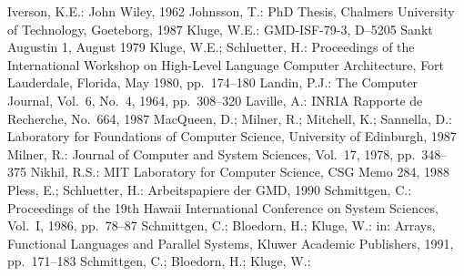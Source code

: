 {\begin{thebibliography}{AAAA}
%
Iverson, K.E.:
\bmt
{}
\amt
John Wiley, 1962
%
%
Johnsson, T.:
\bmt
{}
\amt
PhD Thesis, Chalmers
University of Technology, Goeteborg, 1987
%
Kluge, W.E.:
\bmt
{}
\amt
GMD-ISF-79-3, D--5205 Sankt Augustin 1, August 1979
%
Kluge, W.E.; Schluetter, H.:
\bmt
{}
\amt
Proceedings of the International Workshop on
High-Level Language Computer Architecture,
Fort Lauderdale, Florida, May 1980,
pp.~174--180
%
Landin, P.J.:
\bmt
{}
\amt
The Computer Journal, Vol.~6, No.~4, 1964,
pp.~308--320
%
Laville, A.:
\bmt
{}
\amt
INRIA Rapporte de Recherche, No.~664, 1987
%
MacQueen, D.; Milner, R.; Mitchell, K.; Sannella, D.:
\bmt
{}
\amt
Laboratory for Foundations of Computer Science, University of
Edinburgh, 1987
%
Milner, R.:
\bmt
{}
\amt
Journal of Computer and System Sciences, Vol.~17, 1978,
pp.~348--375
%
Nikhil, R.S.:
\bmt
{}
\amt
MIT Laboratory for Computer Science, CSG Memo 284, 1988
%
Pless, E.; Schluetter, H.:
\bmt
{}
\amt
Arbeitspapiere der GMD, 1990
%
Schmittgen, C.:
\bmt
{}
\amt
Proceedings of the 19th Hawaii International Conference
on System Sciences, Vol.~I, 1986,
pp.~78--87
%
Schmittgen, C.; Bloedorn, H.; Kluge, W.:
\bmt
{}
\amt
in: Arrays, Functional Languages and Parallel Systems,
Kluwer Academic Publishers, 1991,
pp.~171--183
%
Schmittgen, C.; Bloedorn, H.; Kluge, W.:
\bmt
{}
\amt

\end{thebibliography}}

